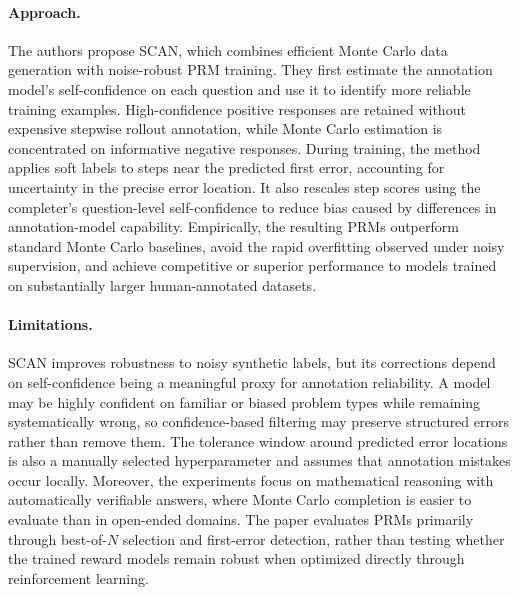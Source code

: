 \documentclass[11pt]{article}
\begin{document}
\paragraph{Approach.}
The authors propose SCAN, which combines efficient Monte Carlo data generation with noise-robust PRM training. They first estimate the annotation model's self-confidence on each question and use it to identify more reliable training examples. High-confidence positive responses are retained without expensive stepwise rollout annotation, while Monte Carlo estimation is concentrated on informative negative responses. During training, the method applies soft labels to steps near the predicted first error, accounting for uncertainty in the precise error location. It also rescales step scores using the completer's question-level self-confidence to reduce bias caused by differences in annotation-model capability. Empirically, the resulting PRMs outperform standard Monte Carlo baselines, avoid the rapid overfitting observed under noisy supervision, and achieve competitive or superior performance to models trained on substantially larger human-annotated datasets.

\paragraph{Limitations.}
SCAN improves robustness to noisy synthetic labels, but its corrections depend on self-confidence being a meaningful proxy for annotation reliability. A model may be highly confident on familiar or biased problem types while remaining systematically wrong, so confidence-based filtering may preserve structured errors rather than remove them. The tolerance window around predicted error locations is also a manually selected hyperparameter and assumes that annotation mistakes occur locally. Moreover, the experiments focus on mathematical reasoning with automatically verifiable answers, where Monte Carlo completion is easier to evaluate than in open-ended domains. The paper evaluates PRMs primarily through best-of-$N$ selection and first-error detection, rather than testing whether the trained reward models remain robust when optimized directly through reinforcement learning.
\end{document}
